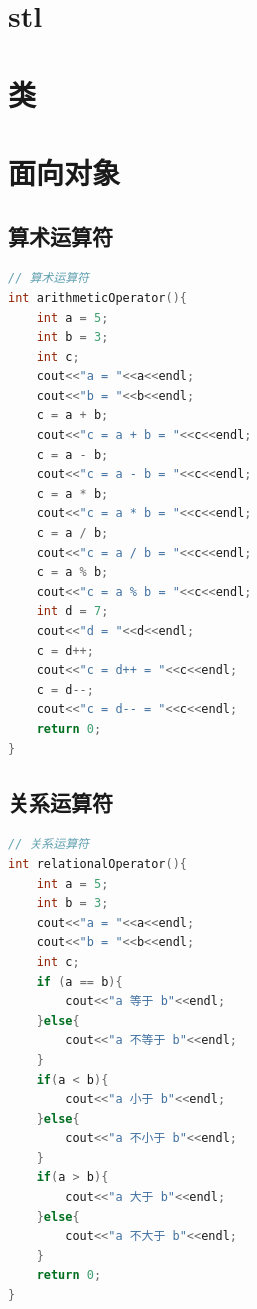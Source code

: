 \documentclass[12pt,twiside,a4paper]{ctexbook}
\numberwithin{chapter}{part}
\begin{document}
\chapter{stl}

\chapter{类}

\chapter{面向对象}

\section{算术运算符}
\begin{lstlisting}[language=C++]
// 算术运算符
int arithmeticOperator(){
	int a = 5;
	int b = 3;
	int c;
	cout<<"a = "<<a<<endl;
	cout<<"b = "<<b<<endl;
	c = a + b;
	cout<<"c = a + b = "<<c<<endl;
	c = a - b;
	cout<<"c = a - b = "<<c<<endl;
	c = a * b;
	cout<<"c = a * b = "<<c<<endl;
	c = a / b;
	cout<<"c = a / b = "<<c<<endl;
	c = a % b;
	cout<<"c = a % b = "<<c<<endl;
	int d = 7;
	cout<<"d = "<<d<<endl;
	c = d++;
	cout<<"c = d++ = "<<c<<endl;
	c = d--;
	cout<<"c = d-- = "<<c<<endl;
	return 0;
}
\end{lstlisting}

\section{关系运算符}
\begin{lstlisting}[language=C++]
// 关系运算符
int relationalOperator(){
	int a = 5;
	int b = 3;
	cout<<"a = "<<a<<endl;
	cout<<"b = "<<b<<endl;
	int c;
	if (a == b){
		cout<<"a 等于 b"<<endl;
	}else{
		cout<<"a 不等于 b"<<endl;
	}
	if(a < b){
		cout<<"a 小于 b"<<endl;
	}else{
		cout<<"a 不小于 b"<<endl;
	}
	if(a > b){
		cout<<"a 大于 b"<<endl;
	}else{
		cout<<"a 不大于 b"<<endl;
	}
	return 0;
}
\end{lstlisting}
\end{document}
